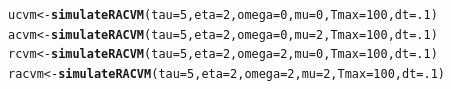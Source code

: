 \documentclass[10pt]{article}\usepackage[]{graphicx}\usepackage[]{color}
\makeatletter
\newcommand{\hlnum}[1]{\textcolor[rgb]{0.686,0.059,0.569}{#1}}%
\newcommand{\hlstd}[1]{\textcolor[rgb]{0.345,0.345,0.345}{#1}}%
\newcommand{\hlkwb}[1]{\textcolor[rgb]{0.69,0.353,0.396}{#1}}%
\newcommand{\hlkwc}[1]{\textcolor[rgb]{0.333,0.667,0.333}{#1}}%
\newcommand{\hlkwd}[1]{\textcolor[rgb]{0.737,0.353,0.396}{\textbf{#1}}}%
\newenvironment{kframe}{%
 \def\at@end@of@kframe{}%
 \ifinner\ifhmode%
  \def\at@end@of@kframe{\end{minipage}}%
  \begin{minipage}{\columnwidth}%
 \fi\fi%
 \def\FrameCommand##1{\hskip\@totalleftmargin \hskip-\fboxsep
 \colorbox{shadecolor}{##1}\hskip-\fboxsep
     \hskip-\linewidth \hskip-\@totalleftmargin \hskip\columnwidth}%
 \MakeFramed {\advance\hsize-\width
   \@totalleftmargin\z@ \linewidth\hsize
   \@setminipage}}%
 {\par\unskip\endMakeFramed%
 \at@end@of@kframe}
\newenvironment{knitrout}{}{} %
\makeatother
\begin{document}
\begin{knitrout}
\color{fgcolor}\begin{kframe}
\begin{alltt}
\hlstd{ucvm} \hlkwb{<-} \hlkwd{simulateRACVM}\hlstd{(}\hlkwc{tau} \hlstd{=} \hlnum{5}\hlstd{,} \hlkwc{eta} \hlstd{=} \hlnum{2}\hlstd{,} \hlkwc{omega} \hlstd{=} \hlnum{0}\hlstd{,} \hlkwc{mu} \hlstd{=} \hlnum{0}\hlstd{,} \hlkwc{Tmax} \hlstd{=} \hlnum{100}\hlstd{,} \hlkwc{dt} \hlstd{=} \hlnum{.1}\hlstd{)}
\hlstd{acvm} \hlkwb{<-} \hlkwd{simulateRACVM}\hlstd{(}\hlkwc{tau} \hlstd{=} \hlnum{5}\hlstd{,} \hlkwc{eta} \hlstd{=} \hlnum{2}\hlstd{,} \hlkwc{omega} \hlstd{=} \hlnum{0}\hlstd{,} \hlkwc{mu} \hlstd{=} \hlnum{2}\hlstd{,} \hlkwc{Tmax} \hlstd{=} \hlnum{100}\hlstd{,} \hlkwc{dt} \hlstd{=} \hlnum{.1}\hlstd{)}
\hlstd{rcvm} \hlkwb{<-} \hlkwd{simulateRACVM}\hlstd{(}\hlkwc{tau} \hlstd{=} \hlnum{5}\hlstd{,} \hlkwc{eta} \hlstd{=} \hlnum{2}\hlstd{,} \hlkwc{omega} \hlstd{=} \hlnum{2}\hlstd{,} \hlkwc{mu} \hlstd{=} \hlnum{0}\hlstd{,} \hlkwc{Tmax} \hlstd{=} \hlnum{100}\hlstd{,} \hlkwc{dt} \hlstd{=} \hlnum{.1}\hlstd{)}
\hlstd{racvm} \hlkwb{<-} \hlkwd{simulateRACVM}\hlstd{(}\hlkwc{tau} \hlstd{=} \hlnum{5}\hlstd{,} \hlkwc{eta} \hlstd{=} \hlnum{2}\hlstd{,} \hlkwc{omega} \hlstd{=} \hlnum{2}\hlstd{,} \hlkwc{mu} \hlstd{=} \hlnum{2}\hlstd{,} \hlkwc{Tmax} \hlstd{=} \hlnum{100}\hlstd{,} \hlkwc{dt} \hlstd{=} \hlnum{.1}\hlstd{)}
\end{alltt}
\end{kframe}
\end{knitrout}
\end{document}
